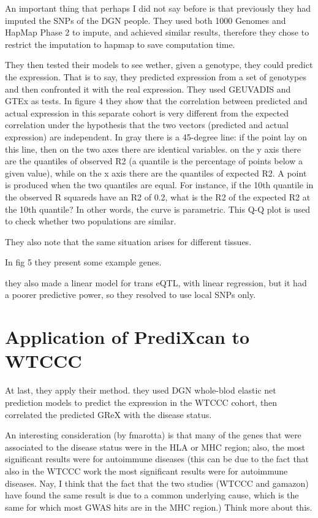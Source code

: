 \documentclass[../main.tex]{subfiles}
\begin{document}
An important thing that perhaps I did not say before is that previously 
they had imputed the SNPs of the DGN people. They used both 1000 Genomes 
and HapMap Phase 2 to impute, and achieved similar results, therefore 
they chose to restrict the imputation to hapmap to save computation 
time.

They then tested their models to see wether, given a genotype, they 
could predict the expression. That is to say, they predicted expression 
from a set of genotypes and then confronted it with the real expression. 
They used GEUVADIS and GTEx as tests. In figure 4 they show that the 
correlation between predicted and actual expression in this separate 
cohort is very different from the expected correlation under the 
hypothesis that the two vectors (predicted and actual expression) are 
independent. In gray there is a 45-degree line: if the point lay on this 
line, then on the two axes there are identical variables. on the y axis 
there are the quantiles of observed R2 (a quantile is the percentage of 
points below a given value), while on the x axis there are the quantiles 
of expected R2. A point is produced when the two quantiles are equal. 
For instance, if the 10th quantile in the observed R squareds have an R2 
of 0.2, what is the R2 of the expected R2 at the 10th quantile? In other 
words, the curve is parametric. This Q-Q plot is used to check whether 
two populations are similar.

They also note that the same situation arises for different tissues.

In fig 5 they present some example genes.

they also made a linear model for trans eQTL, with linear regression, 
but it had a poorer predictive power, so they resolved to use local SNPs 
only.

\section{Application of PrediXcan to WTCCC}

At last, they apply their method. they used DGN whole-blod elastic net 
prediction models to predict the expression in the WTCCC cohort, then 
correlated the predicted GReX with the disease status.

An interesting consideration (by fmarotta) is that many of the genes 
that were associated to the disease status were in the HLA or MHC 
region; also, the most significant results were for autoimmune diseases 
(this can be due to the fact that also in the WTCCC work the most 
significant results were for autoimmune diseases. Nay, I think that the 
fact that the two studies (WTCCC and gamazon) have found the same result 
is due to a common underlying cause, which is the same for which most 
GWAS hits are in the MHC region.) Think more about this.
\end{document}

